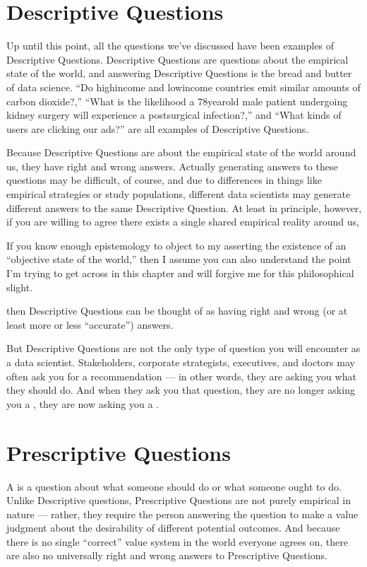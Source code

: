 \documentclass[letterpaper,10pt,english]{jupyterBook}
\begin{document}
\section{Descriptive Questions}
\label{\detokenize{30_questions/05_descriptive_v_prescriptive:descriptive-questions}}
\sphinxAtStartPar
Up until this point, all the questions we’ve discussed have been examples of Descriptive Questions. Descriptive Questions are questions about the empirical state of the world, and answering Descriptive Questions is the bread and butter of data science. “Do high\sphinxhyphen{}income and low\sphinxhyphen{}income countries emit similar amounts of carbon dioxide?,” “What is the likelihood a 78\sphinxhyphen{}year\sphinxhyphen{}old male patient undergoing kidney surgery will experience a post\sphinxhyphen{}surgical infection?,” and “What kinds of users are clicking our ads?” are all examples of Descriptive Questions.

\sphinxAtStartPar
Because Descriptive Questions are about the empirical state of the world around us, they have right and wrong answers. Actually generating answers to these questions may be difficult, of course, and due to differences in things like empirical strategies or study populations, different data scientists may generate different answers to the same Descriptive Question. At least in principle, however, if you are willing to agree there exists a single shared empirical reality around us,%
\begin{footnote}[1]\sphinxAtStartFootnote
If you know enough epistemology to object to my asserting the existence of an “objective state of the world,” then I assume you can also understand the point I’m trying to get across in this chapter and will forgive me for this philosophical slight.
%
\end{footnote} then Descriptive Questions can be thought of as having right and wrong (or at least more or less “accurate”) answers.

\sphinxAtStartPar
But Descriptive Questions are not the only type of question you will encounter as a data scientist. Stakeholders, corporate strategists, executives, and doctors may often ask you for a recommendation — in other words, they are asking you what they should do. And when they ask you that question, they are no longer asking you a , they are now asking you a .


\section{Prescriptive Questions}
\label{\detokenize{30_questions/05_descriptive_v_prescriptive:prescriptive-questions}}
\sphinxAtStartPar
A  is a question about what someone should do or what someone ought to do. Unlike Descriptive questions, Prescriptive Questions are not purely empirical in nature — rather, they require the person answering the question to make a value judgment about the desirability of different potential outcomes. And because there is no single “correct” value system in the world everyone agrees on, there are also no universally right and wrong answers to Prescriptive Questions.
\end{document}
